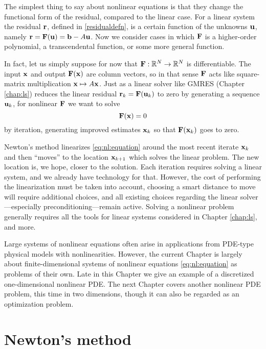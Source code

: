 
The simplest thing to say about nonlinear equations is that they change the functional form of the residual, compared to the linear case.  For a linear system the residual $\mathbf{r}$, defined in \eqref{residualdefn}, is a certain function of the unknowns $\mathbf{u}$, namely $\mathbf{r} = \mathbf{F}(\mathbf{u}) = \mathbf{b} - A \mathbf{u}$.  Now we consider cases in which $\mathbf{F}$ is a higher-order polynomial, a transcendental function, or some more general function.

In fact, let us simply suppose for now that $\mathbf{F} : \mathbb{R}^N \to \mathbb{R}^N$ is differentiable.  The input $\mathbf{x}$ and output $\mathbf{F}(\mathbf{x})$ are column vectors, so in that sense $\mathbf{F}$ acts like square-matrix multiplication $\mathbf{x}\mapsto A\mathbf{x}$.  Just as a linear solver like GMRES (Chapter \ref{chap:ls}) reduces the linear residual $\mathbf{r}_k=\mathbf{F}(\mathbf{u}_k)$ to zero by generating a sequence $\mathbf{u}_k$, for nonlinear $\mathbf{F}$ we want to solve
\begin{equation}
   \mathbf{F}(\mathbf{x}) = 0   \label{eq:nl:equation}
\end{equation}
by iteration, generating improved estimates $\mathbf{x}_k$ so that $\mathbf{F}(\mathbf{x}_k)$ goes to zero.

Newton's method linearizes \eqref{eq:nl:equation} around the most recent iterate $\mathbf{x}_k$ and then ``moves'' to the location $\mathbf{x}_{k+1}$ which solves the linear problem.  The new location is, we hope, closer to the solution.  Each iteration requires solving a linear system, and we already have \PETSc technology for that.  However, the cost of performing the linearization must be taken into account, choosing a smart distance to move will require additional choices, and all existing choices regarding the linear solver---especially preconditioning---remain active.  Solving a nonlinear problem generally requires all the tools for linear systems considered in Chapter \ref{chap:ls}, and more.

Large systems of nonlinear equations often arise in applications from PDE-type physical models with nonlinearities.  However, the current Chapter is largely about finite-dimensional systems of nonlinear equations \eqref{eq:nl:equation} as problems of their own.  Late in this Chapter we give an example of a discretized one-dimensional nonlinear PDE.  The next Chapter covers another nonlinear PDE problem, this time in two dimensions, though it can also be regarded as an optimization problem.


\section{Newton's method}


